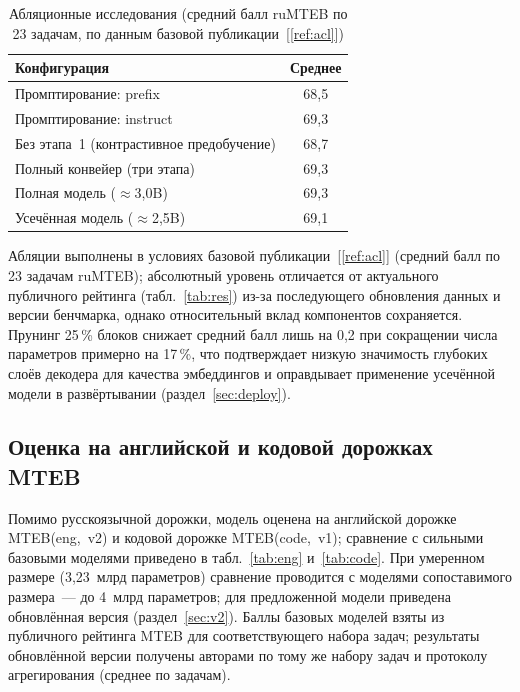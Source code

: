 \documentclass[12pt,a4paper]{article}
\begin{document}
\begin{table}[ht]
  \centering
  \caption{Абляционные исследования (средний балл ruMTEB по 23 задачам, по
  данным базовой публикации~[\ref{ref:acl}])}\label{tab:abl}
  \begin{tabular}{lc}
    \toprule
    Конфигурация & Среднее \\
    \midrule
    Промптирование: prefix                       & 68,5 \\
    Промптирование: instruct                     & 69,3 \\
    Без этапа~1 (контрастивное предобучение)      & 68,7 \\
    Полный конвейер (три этапа)                   & 69,3 \\
    Полная модель ($\approx$3{,}0B)              & 69,3 \\
    Усечённая модель ($\approx$2{,}5B)           & 69,1 \\
    \bottomrule
  \end{tabular}
\end{table}

\noindent Абляции выполнены в условиях базовой публикации~[\ref{ref:acl}]
(средний балл по 23 задачам ruMTEB); абсолютный уровень отличается от
актуального публичного рейтинга (табл.~\ref{tab:res}) из-за последующего
обновления данных и версии бенчмарка, однако относительный вклад компонентов
сохраняется. Прунинг 25\,\% блоков снижает средний балл лишь на 0{,}2 при
сокращении числа параметров примерно на 17\,\%, что подтверждает низкую
значимость глубоких слоёв декодера для качества эмбеддингов и оправдывает
применение усечённой модели в развёртывании (раздел~\ref{sec:deploy}).

\subsection{Оценка на английской и кодовой дорожках MTEB}
Помимо русскоязычной дорожки, модель оценена на английской дорожке
MTEB(eng,~v2) и кодовой дорожке MTEB(code,~v1); сравнение с сильными базовыми
моделями приведено в табл.~\ref{tab:eng} и~\ref{tab:code}. При умеренном размере
(3,23~млрд параметров) сравнение проводится с моделями сопоставимого размера~---
до 4~млрд параметров; для предложенной модели приведена обновлённая версия
(раздел~\ref{sec:v2}). Баллы базовых моделей взяты из публичного рейтинга MTEB
для соответствующего набора задач; результаты обновлённой версии получены
авторами по тому же набору задач и протоколу агрегирования (среднее по задачам).
\end{document}
